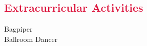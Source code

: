 \documentclass[margin, 10pt]{res} %
\let\oldsection\section
\renewcommand{\section}[1]{\oldsection{\textcolor{crimson}{#1}}}
\begin{document}
\begin{resume}

\section{Extracurricular Activities} 

Bagpiper \\
Ballroom Dancer%


\end{resume}
\end{document}
